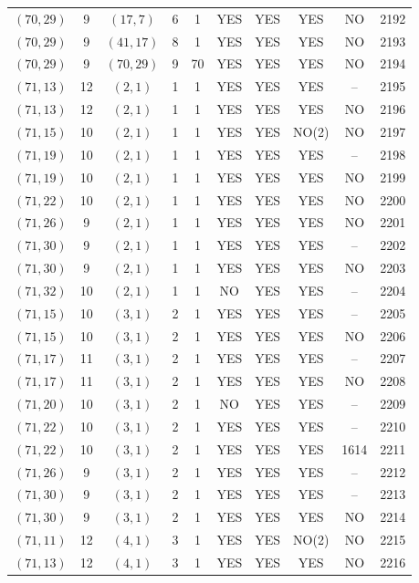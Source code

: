 \begin{longtable}{|c|c|c|c|c|c|c|c|c|c|}
$(70, 29)$ & 9 & $(17, 7)$ & 6 & 1 & YES & YES & YES & NO & 2192\\
$(70, 29)$ & 9 & $(41, 17)$ & 8 & 1 & YES & YES & YES & NO & 2193\\
$(70, 29)$ & 9 & $(70, 29)$ & 9 & 70 & YES & YES & YES & NO & 2194\\
$(71, 13)$ & 12 & $(2, 1)$ & 1 & 1 & YES & YES & YES & -- & 2195\\
$(71, 13)$ & 12 & $(2, 1)$ & 1 & 1 & YES & YES & YES & NO & 2196\\
$(71, 15)$ & 10 & $(2, 1)$ & 1 & 1 & YES & YES & NO(2) & NO & 2197\\
$(71, 19)$ & 10 & $(2, 1)$ & 1 & 1 & YES & YES & YES & -- & 2198\\
$(71, 19)$ & 10 & $(2, 1)$ & 1 & 1 & YES & YES & YES & NO & 2199\\
$(71, 22)$ & 10 & $(2, 1)$ & 1 & 1 & YES & YES & YES & NO & 2200\\
$(71, 26)$ & 9 & $(2, 1)$ & 1 & 1 & YES & YES & YES & NO & 2201\\
$(71, 30)$ & 9 & $(2, 1)$ & 1 & 1 & YES & YES & YES & -- & 2202\\
$(71, 30)$ & 9 & $(2, 1)$ & 1 & 1 & YES & YES & YES & NO & 2203\\
$(71, 32)$ & 10 & $(2, 1)$ & 1 & 1 & NO & YES & YES & -- & 2204\\
$(71, 15)$ & 10 & $(3, 1)$ & 2 & 1 & YES & YES & YES & -- & 2205\\
$(71, 15)$ & 10 & $(3, 1)$ & 2 & 1 & YES & YES & YES & NO & 2206\\
$(71, 17)$ & 11 & $(3, 1)$ & 2 & 1 & YES & YES & YES & -- & 2207\\
$(71, 17)$ & 11 & $(3, 1)$ & 2 & 1 & YES & YES & YES & NO & 2208\\
$(71, 20)$ & 10 & $(3, 1)$ & 2 & 1 & NO & YES & YES & -- & 2209\\
$(71, 22)$ & 10 & $(3, 1)$ & 2 & 1 & YES & YES & YES & -- & 2210\\
$(71, 22)$ & 10 & $(3, 1)$ & 2 & 1 & YES & YES & YES & 1614 & 2211\\
$(71, 26)$ & 9 & $(3, 1)$ & 2 & 1 & YES & YES & YES & -- & 2212\\
$(71, 30)$ & 9 & $(3, 1)$ & 2 & 1 & YES & YES & YES & -- & 2213\\
$(71, 30)$ & 9 & $(3, 1)$ & 2 & 1 & YES & YES & YES & NO & 2214\\
$(71, 11)$ & 12 & $(4, 1)$ & 3 & 1 & YES & YES & NO(2) & NO & 2215\\
$(71, 13)$ & 12 & $(4, 1)$ & 3 & 1 & YES & YES & YES & NO & 2216\\

\end{longtable}
